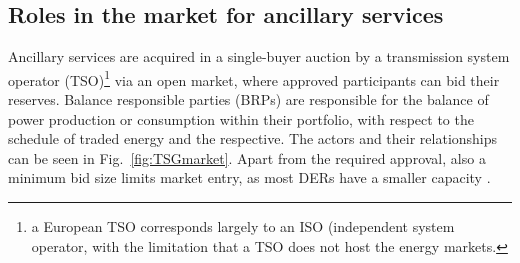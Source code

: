 \subsection{Roles in the market for ancillary services}
Ancillary services are acquired in a single-buyer auction by a transmission system operator (TSO)\footnote{a European TSO corresponds largely to an ISO (independent system operator, with the limitation that a TSO does not  host the energy markets.} via an open market, where approved participants can bid their reserves.  Balance responsible parties (BRPs) are responsible for the balance of power production or consumption within their portfolio, with respect to the schedule of traded energy and the respective. The actors and their relationships can be seen in Fig.~\ref{fig:TSGmarket}.
Apart from the required approval, also a minimum bid size limits market entry, as most DERs have a smaller capacity \cite{koliou2014demand}. %

